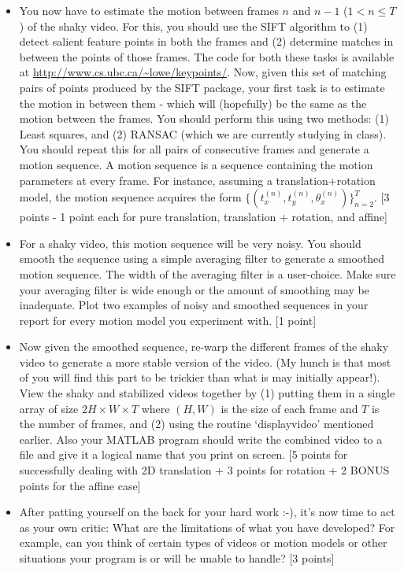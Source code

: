 \documentclass[11pt]{article}
\begin{document}
\begin{enumerate}
\begin{itemize}
\item You now have to estimate the motion between frames $n$ and $n-1$ ($1 < n \leq T$) of the shaky video. For this, you should use the SIFT algorithm to (1) detect salient feature points in both the frames and (2) determine matches in between the points of those frames. The code for both these tasks is available at \url{http://www.cs.ubc.ca/~lowe/keypoints/}. Now, given this set of matching pairs of points produced by the SIFT package, your first task is to estimate the motion in between them - which will (hopefully) be the same as the motion between the frames. You should perform this using two methods: (1) Least squares, and (2) RANSAC (which we are currently studying in class). You should repeat this for all pairs of consecutive frames and generate a motion sequence. A motion sequence is a sequence containing the motion parameters at every frame. For instance, assuming a translation+rotation model, the motion sequence acquires the form $\{(t^{(n)}_x,t^{(n)}_y,\theta^{(n)}_x)\}_{n=2}^{T}$.
\textsf{[3 points - 1 point each for pure translation, translation + rotation, and affine]}

\item For a shaky video, this motion sequence will be very noisy. You should smooth the sequence using a simple averaging filter to generate a smoothed motion sequence. The width of the averaging filter is a user-choice. Make sure your averaging filter is wide enough or the amount of smoothing may be inadequate. Plot two examples of noisy and smoothed sequences in your report for every motion model you experiment with. \textsf{[1 point]}

\item Now given the smoothed sequence, re-warp the different frames of the shaky video to generate a more stable version of the video. (My hunch is that most of you will find this part to be trickier than what is may initially appear!). View the shaky and stabilized videos together by (1) putting them in a single array of size $2H \times W \times T$ where $(H,W)$ is the size of each frame and $T$ is the number of frames, and (2) using the routine `displayvideo' mentioned earlier.  Also your MATLAB program should write the combined video to a file and give it a logical name that you print on screen. \textsf{[5 points for successfully dealing with 2D translation + 3 points for rotation + 2 BONUS points for the affine case]}

\item After patting yourself on the back for your hard work :-), it's now time to act as your own critic: What are the limitations of what you have developed? For example, can you think of certain types of videos or motion models or other situations your program is or will be unable to handle? \textsf{[3 points]}


\end{itemize}
\end{enumerate}
\end{document}
